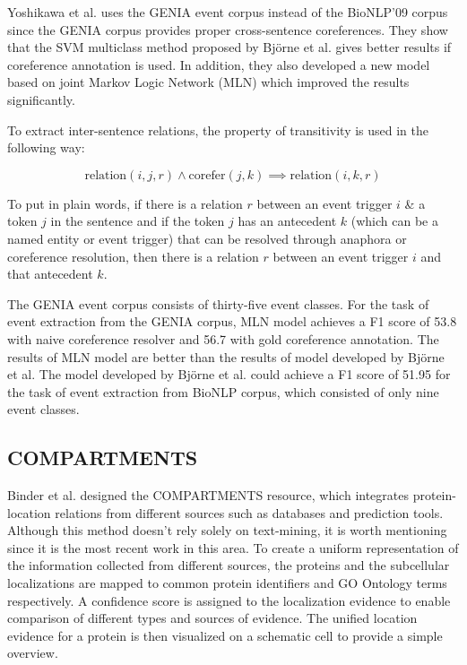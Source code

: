 Yoshikawa et al. uses the GENIA event corpus instead of the BioNLP'09 corpus since the GENIA corpus provides proper cross-sentence coreferences. They show that the SVM multiclass method proposed by Björne et al. gives better results if coreference annotation is used. In addition, they also developed a new model based on joint Markov Logic Network (MLN) which improved the results significantly.

To extract inter-sentence relations, the property of transitivity is used in the following way:

$$
\text{relation} \left( i,j,r \right) \land \text{corefer} \left(j,k \right) \implies \text{relation} \left( i,k,r \right)
$$

To put in plain words, if there is a relation $r$ between an event trigger $i$ \& a token $j$ in the sentence and if the token $j$ has an antecedent $k$ (which can be a named entity or event trigger) that can be resolved through anaphora or coreference resolution, then there is a relation $r$ between an event trigger $i$ and that antecedent $k$.

The GENIA event corpus consists of thirty-five event classes. For the task of event extraction from the GENIA corpus, MLN model achieves a F1 score of 53.8 with naive coreference resolver and 56.7 with gold coreference annotation. The results of MLN model are better than the results of model developed by Björne et al. The model developed by Björne et al. could achieve a F1 score of 51.95 for the task of event extraction from BioNLP corpus, which consisted of only nine event classes.

\subsection{COMPARTMENTS}


Binder et al. \cite{binder2014compartments} designed the COMPARTMENTS resource,  which integrates protein-location relations from different sources such as databases and prediction tools. Although this method doesn't rely solely on text-mining, it is worth mentioning since it is the most recent work in this area. To create a uniform representation of the information collected from different sources, the proteins and the subcellular localizations are mapped to common protein identifiers and GO Ontology terms respectively. A confidence score is assigned to the localization evidence to enable comparison of different types and sources of evidence. The unified location evidence for a protein is then visualized on a schematic cell to  provide a simple overview.

